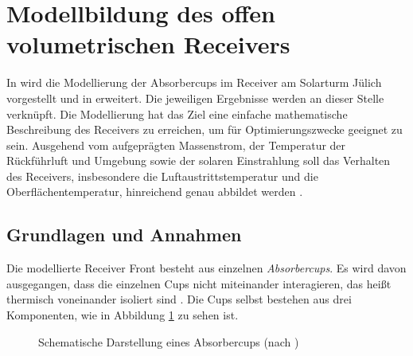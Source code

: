 \section{Modellbildung des offen volumetrischen Receivers} \label{sec_Ausgangszustand}
In \cite[S.90ff]{DissGall} wird die Modellierung der Absorbercups im Receiver am Solarturm Jülich vorgestellt und in \cite{IdingSolarPaces} erweitert.
Die jeweiligen Ergebnisse werden an dieser Stelle verknüpft.
Die Modellierung hat das Ziel eine einfache mathematische Beschreibung des Receivers zu erreichen, um für Optimierungszwecke geeignet zu sein.
Ausgehend vom aufgeprägten Massenstrom, der Temperatur der Rückführluft und Umgebung sowie der solaren Einstrahlung soll das Verhalten des Receivers, insbesondere die Luftaustrittstemperatur und die Oberflächentemperatur, hinreichend genau abbildet werden \cite[S.90]{DissGall}.

\subsection{Grundlagen und Annahmen} \label{subsec_GrundlagenAnnahmen}
Die modellierte Receiver Front besteht aus einzelnen \textit{Absorbercups}.
Es wird davon ausgegangen, dass die einzelnen Cups nicht miteinander interagieren, das heißt thermisch voneinander isoliert sind \cite[S.91]{DissGall}.
Die Cups selbst bestehen aus drei Komponenten, wie in Abbildung \ref{fig_AufbauCup} zu sehen ist. \pagebreak

\begin{figure}[h!]
    \centering
    \setlength{\fboxsep}{1pt}
    \setlength{\fboxrule}{1pt}
    \caption[Schematische Darstellung eines Absorbercups]{Schematische Darstellung eines Absorbercups (nach \cite[S.90]{DissGall})}
    \label{fig_AufbauCup}
\end{figure}

